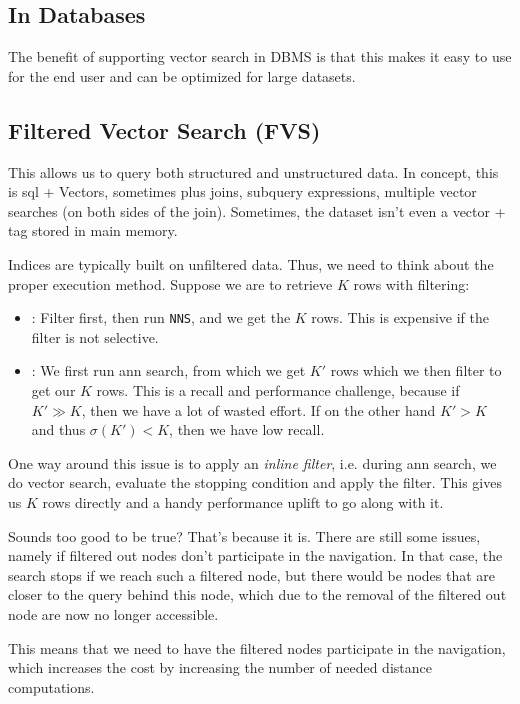 \subsection{In Databases}
The benefit of supporting vector search in DBMS is that this makes it easy to use for the end user and can be optimized for large datasets.

\subsection{Filtered Vector Search (FVS)}
This allows us to query both structured and unstructured data. In concept, this is \acrshort{sql} + Vectors, sometimes plus joins, subquery expressions,
multiple vector searches (on both sides of the join). Sometimes, the dataset isn't even a vector + tag stored in main memory.

Indices are typically built on unfiltered data. Thus, we need to think about the proper execution method. Suppose we are to retrieve $K$ rows with filtering:
\begin{itemize}
    \item {}: Filter first, then run \texttt{NNS}, and we get the $K$ rows. This is expensive if the filter is not selective.
    \item {}: We first run \acrshort{ann} search, from which we get $K'$ rows which we then filter to get our $K$ rows.
          This is a recall and performance challenge, because if $K' \gg K$, then we have a lot of wasted effort.
          If on the other hand $K' > K$ and thus $\sigma(K') < K$, then we have low recall.
\end{itemize}

One way around this issue is to apply an \textit{inline filter}, i.e. during \acrshort{ann} search, we do vector search, evaluate the stopping condition and apply the filter.
This gives us $K$ rows directly and a handy performance uplift to go along with it.

Sounds too good to be true? That's because it is. There are still some issues, namely if filtered out nodes don't participate in the navigation.
In that case, the search stops if we reach such a filtered node, but there would be nodes that are closer to the query behind this node,
which due to the removal of the filtered out node are now no longer accessible.

This means that we need to have the filtered nodes participate in the navigation, which increases the cost by increasing the number of needed distance computations.

